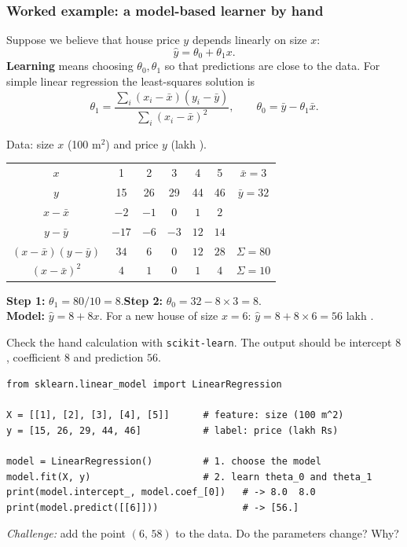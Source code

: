 \subsubsection*{Worked example: a model-based learner by hand}

Suppose we believe that house price $y$ depends linearly on size $x$:
\[
  \hat y = \theta_0 + \theta_1 x .
\]
\textbf{Learning} means choosing $\theta_0,\theta_1$ so that predictions are close to the data. For simple linear regression the least-squares solution is
\[
  \theta_1=\frac{\sum_i (x_i-\bar x)(y_i-\bar y)}{\sum_i (x_i-\bar x)^2},\qquad
  \theta_0=\bar y-\theta_1\bar x .
\]

\begin{example}
Data: size $x$ (100 m$^2$) and price $y$ (lakh \rupee{}).

\begin{center}
\begin{tabular}{@{}c|ccccc|c@{}}
\toprule
$x$ & 1 & 2 & 3 & 4 & 5 & $\bar x=3$\\
$y$ & 15 & 26 & 29 & 44 & 46 & $\bar y=32$\\
\midrule
$x-\bar x$ & $-2$ & $-1$ & $0$ & $1$ & $2$ & \\
$y-\bar y$ & $-17$ & $-6$ & $-3$ & $12$ & $14$ & \\
$(x-\bar x)(y-\bar y)$ & $34$ & $6$ & $0$ & $12$ & $28$ & $\Sigma=80$\\
$(x-\bar x)^2$ & $4$ & $1$ & $0$ & $1$ & $4$ & $\Sigma=10$\\
\bottomrule
\end{tabular}
\end{center}
\textbf{Step 1:} $\theta_1 = 80/10 = 8$.\quad \textbf{Step 2:} $\theta_0 = 32 - 8\times 3 = 8$.\\
\textbf{Model:} $\hat y = 8 + 8x$. For a new house of size $x=6$: $\hat y = 8+8\times 6 = 56$ lakh \rupee{}.
\end{example}

\begin{tryit}
Check the hand calculation with \texttt{scikit-learn}. The output should be intercept $8$, coefficient $8$ and prediction $56$.
\begin{lstlisting}
from sklearn.linear_model import LinearRegression

X = [[1], [2], [3], [4], [5]]      # feature: size (100 m^2)
y = [15, 26, 29, 44, 46]           # label: price (lakh Rs)

model = LinearRegression()         # 1. choose the model
model.fit(X, y)                    # 2. learn theta_0 and theta_1
print(model.intercept_, model.coef_[0])   # -> 8.0  8.0
print(model.predict([[6]]))               # -> [56.]
\end{lstlisting}
\emph{Challenge:} add the point $(6,\,58)$ to the data. Do the parameters change? Why?
\end{tryit}

